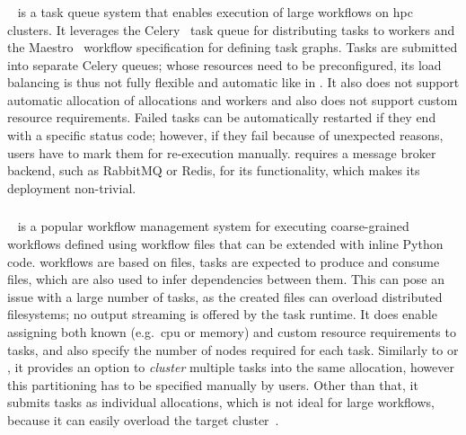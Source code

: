 \subsubsection*{\merlin}
\merlin~\cite{merlin} is a task queue system that enables execution of large workflows on
\gls{hpc} clusters. It leverages the Celery~\cite{celery} task queue for
distributing tasks to workers and the Maestro~\cite{maestro} workflow specification for
defining task graphs. Tasks are submitted into separate Celery queues; whose resources need to be
preconfigured, its load balancing is thus not fully flexible and automatic like in
\hyperqueue{}. It also does not support automatic allocation of allocations and workers
and also does not support custom resource requirements. Failed tasks can be automatically restarted
if they end with a specific status code; however, if they fail because of unexpected reasons, users
have to mark them for re-execution manually. \merlin{} requires a message broker
backend, such as RabbitMQ or Redis, for its functionality, which makes its deployment non-trivial.

\subsubsection*{\snakemake}
\snakemake~\cite{snakemake} is a popular workflow management system for executing
coarse-grained workflows defined using workflow files that can be extended with inline Python code.
\snakemake{} workflows are based on files, tasks are expected to produce and consume
files, which are also used to infer dependencies between them. This can pose an issue with a large
number of tasks, as the created files can overload distributed filesystems; no output streaming is
offered by the task runtime. It does enable assigning both known (e.g.\ \gls{cpu} or
memory) and custom resource requirements to tasks, and also specify the number of nodes required
for each task. Similarly to \pegasus{} or \autosubmit{}, it provides an
option to \emph{cluster} multiple tasks into the same allocation, however this
partitioning has to be specified manually by users. Other than that, it submits tasks as individual
allocations, which is not ideal for large workflows, because it can easily overload the target
cluster~\cite{nersc-snakemake}.

